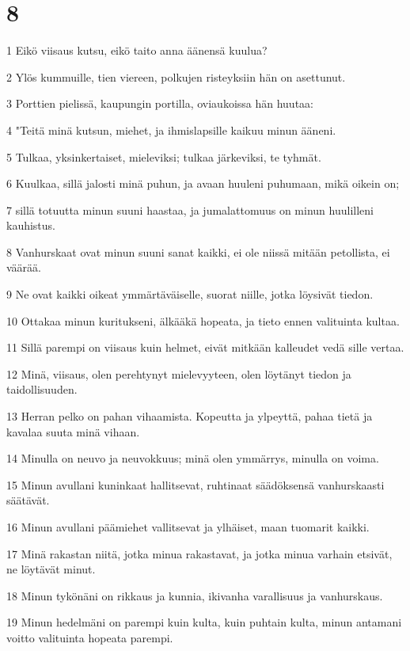 \chapter{8}

\par 1 Eikö viisaus kutsu, eikö taito anna äänensä kuulua?
\par 2 Ylös kummuille, tien viereen, polkujen risteyksiin hän on asettunut.
\par 3 Porttien pielissä, kaupungin portilla, oviaukoissa hän huutaa:
\par 4 "Teitä minä kutsun, miehet, ja ihmislapsille kaikuu minun ääneni.
\par 5 Tulkaa, yksinkertaiset, mieleviksi; tulkaa järkeviksi, te tyhmät.
\par 6 Kuulkaa, sillä jalosti minä puhun, ja avaan huuleni puhumaan, mikä oikein on;
\par 7 sillä totuutta minun suuni haastaa, ja jumalattomuus on minun huulilleni kauhistus.
\par 8 Vanhurskaat ovat minun suuni sanat kaikki, ei ole niissä mitään petollista, ei väärää.
\par 9 Ne ovat kaikki oikeat ymmärtäväiselle, suorat niille, jotka löysivät tiedon.
\par 10 Ottakaa minun kuritukseni, älkääkä hopeata, ja tieto ennen valituinta kultaa.
\par 11 Sillä parempi on viisaus kuin helmet, eivät mitkään kalleudet vedä sille vertaa.
\par 12 Minä, viisaus, olen perehtynyt mielevyyteen, olen löytänyt tiedon ja taidollisuuden.
\par 13 Herran pelko on pahan vihaamista. Kopeutta ja ylpeyttä, pahaa tietä ja kavalaa suuta minä vihaan.
\par 14 Minulla on neuvo ja neuvokkuus; minä olen ymmärrys, minulla on voima.
\par 15 Minun avullani kuninkaat hallitsevat, ruhtinaat säädöksensä vanhurskaasti säätävät.
\par 16 Minun avullani päämiehet vallitsevat ja ylhäiset, maan tuomarit kaikki.
\par 17 Minä rakastan niitä, jotka minua rakastavat, ja jotka minua varhain etsivät, ne löytävät minut.
\par 18 Minun tykönäni on rikkaus ja kunnia, ikivanha varallisuus ja vanhurskaus.
\par 19 Minun hedelmäni on parempi kuin kulta, kuin puhtain kulta, minun antamani voitto valituinta hopeata parempi.
